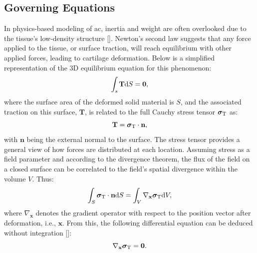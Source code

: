 \subsection{Governing Equations}
%
In physics-based modeling of \ac{ac}, inertia and weight are often overlooked due to the tissue's low-density structure [\cite{pearle2005}]. Newton's second law suggests that any force applied to the tissue, or surface traction, will reach equilibrium with other applied forces, leading to cartilage deformation. Below is a simplified representation of the 3D equilibrium equation for this phenomenon:
%
\begin{equation}
    \int_s \mathbf{T} {\rm d}S = \mathbf{0},
\end{equation}
%
where the surface area of the deformed solid material is $S$, and the associated traction on this surface, $\mathbf{T}$, is related to the full Cauchy stress tensor $\boldsymbol{\sigma}_{\rm T}$ as:
%
\begin{equation}\label{eq-traction}
    \mathbf{T} = \boldsymbol{\sigma}_{\rm T} \cdot \textbf{n},
\end{equation}
%
with $\textbf{n}$ being the external normal to the surface. The stress tensor provides a general view of how forces are distributed at each location. Assuming stress as a field parameter and according to the divergence theorem, the flux of the field on a closed surface can be correlated to the field's spatial divergence within the volume $V$. Thus:
%
\begin{equation}
    \int_S \boldsymbol{\sigma}_{\rm T} \cdot \textbf{n} {\rm d}S = \int_V \nabla_\textbf{x} \boldsymbol{\sigma}_{\rm T} {\rm d}V,
\end{equation}
%
where $\nabla_\textbf{x}$ denotes the gradient operator with respect to the position vector after deformation, i.e., $\textbf{x}$. From this, the following differential equation can be deduced without integration [\cite{gerhard-book}]:
%
\begin{equation}\label{eq-strong}
    \nabla_\textbf{x} \boldsymbol{\sigma}_{\rm T} = \textbf{0}.
\end{equation}

